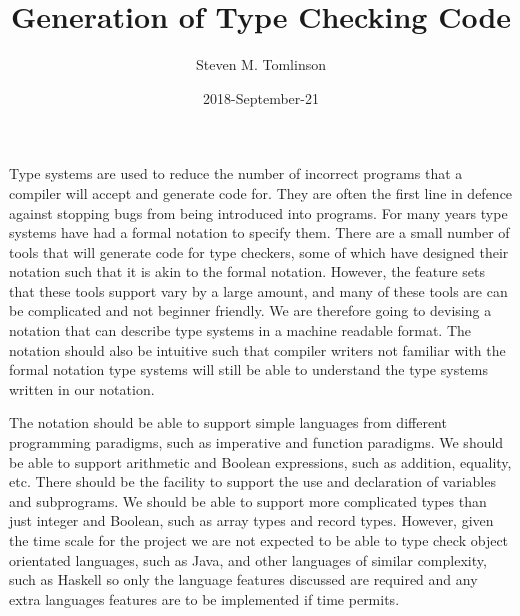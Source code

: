 \documentclass{UoYCSproject}
\author{Steven M. Tomlinson}
\title{Generation of Type Checking Code}
\date{2018-September-21}
\begin{document}
  \maketitle
  \renewcommand*{\lstlistlistingname}{List of Listings}
  \lstlistoflistings

  \listoffigures

  \begin{summary}
    Type systems are used to reduce the number of incorrect programs that a compiler will accept and generate code for.
    They are often the first line in defence against stopping bugs from being introduced into programs.
    For many years type systems have had a formal notation to specify them.
    There are a small number of tools that will generate code for type checkers, some of which have designed their notation such that it is akin to the formal notation.
    However, the feature sets that these tools support vary by a large amount, and many of these tools are can be complicated and not beginner friendly.
    We are therefore going to devising a notation that can describe type systems in a machine readable format.
    The notation should also be intuitive such that compiler writers not familiar with the formal notation type systems will still be able to understand the type systems written in our notation.
  
    The notation should be able to support simple languages from different programming paradigms, such as imperative and function paradigms.
    We should be able to support arithmetic and Boolean expressions, such as addition, equality, etc.
    There should be the facility to support the use and declaration of variables and subprograms.
    We should be able to support more complicated types than just integer and Boolean, such as array types and record types.
    However, given the time scale for the project we are not expected to be able to type check object orientated languages, such as Java,  and other languages of similar complexity, such as Haskell so only the language features discussed are required and any extra languages features are to be implemented if time permits.
    

\end{summary}
\end{document}
